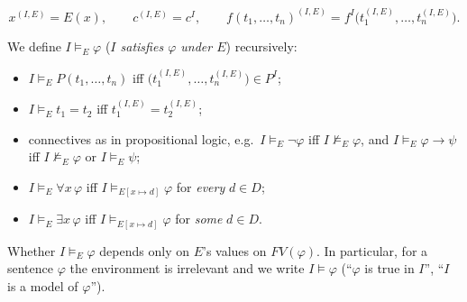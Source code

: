 \begin{definition}
\[x^{(I,E)} = E(x),\qquad c^{(I,E)}=c^I,\qquad
f(t_1,\dots,t_n)^{(I,E)} = f^I\big(t_1^{(I,E)},\dots,t_n^{(I,E)}\big).\]
\end{definition}

\begin{definition}[Satisfaction]
We define $I\models_E\varphi$ (\emph{$I$ satisfies $\varphi$ under $E$}) recursively:
\begin{itemize}
  \item $I\models_E P(t_1,\dots,t_n)$ iff $\big(t_1^{(I,E)},\dots,t_n^{(I,E)}\big)\in P^I$;
  \item $I\models_E t_1=t_2$ iff $t_1^{(I,E)} = t_2^{(I,E)}$;
  \item connectives as in propositional logic, e.g.\ $I\models_E\neg\varphi$ iff
        $I\not\models_E\varphi$, and $I\models_E \varphi\to\psi$ iff $I\not\models_E\varphi$
        or $I\models_E\psi$;
  \item $I\models_E\forall x\,\varphi$ iff $I\models_{E[x\mapsto d]}\varphi$ for
        \emph{every} $d\in D$;
  \item $I\models_E\exists x\,\varphi$ iff $I\models_{E[x\mapsto d]}\varphi$ for
        \emph{some} $d\in D$.
\end{itemize}
\end{definition}

\begin{lemma}
Whether $I\models_E\varphi$ depends only on $E$'s values on $FV(\varphi)$. In particular,
for a sentence $\varphi$ the environment is irrelevant and we write $I\models\varphi$
(``$\varphi$ is true in $I$'', ``$I$ is a model of $\varphi$'').
\end{lemma}

